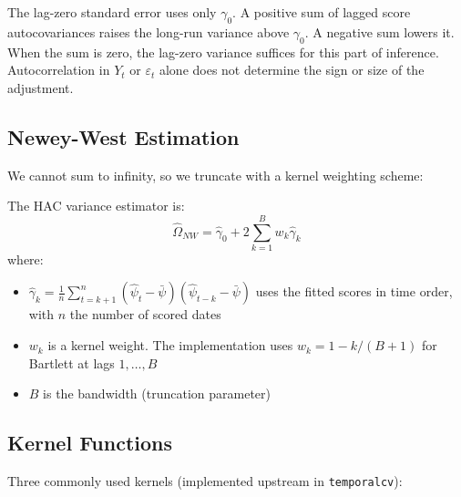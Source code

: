 The lag-zero standard error uses only $\gamma_0$. A positive sum of lagged score autocovariances raises the long-run variance above $\gamma_0$. A negative sum lowers it. When the sum is zero, the lag-zero variance suffices for this part of inference. Autocorrelation in $Y_t$ or $\varepsilon_t$ alone does not determine the sign or size of the adjustment.

\subsection{Newey-West Estimation}

We cannot sum to infinity, so we truncate with a kernel weighting scheme:

\begin{definition}
\label{def:newey_west}
The HAC variance estimator is:
\begin{equation}
\hat{\Omega}_{NW} = \hat{\gamma}_0 + 2\sum_{k=1}^{B} w_k \hat{\gamma}_k
\end{equation}
where:
\begin{itemize}
    \item $\hat{\gamma}_k = \frac{1}{n}\sum_{t=k+1}^{n} (\hat{\psi}_t-\bar{\psi})(\hat{\psi}_{t-k}-\bar{\psi})$ uses the fitted scores in time order, with $n$ the number of scored dates
    \item $w_k$ is a kernel weight. The implementation uses $w_k=1-k/(B+1)$ for Bartlett at lags $1,\ldots,B$
    \item $B$ is the bandwidth (truncation parameter)
\end{itemize}
\end{definition}

\subsection{Kernel Functions}

Three commonly used kernels (implemented upstream in \texttt{temporalcv}):

